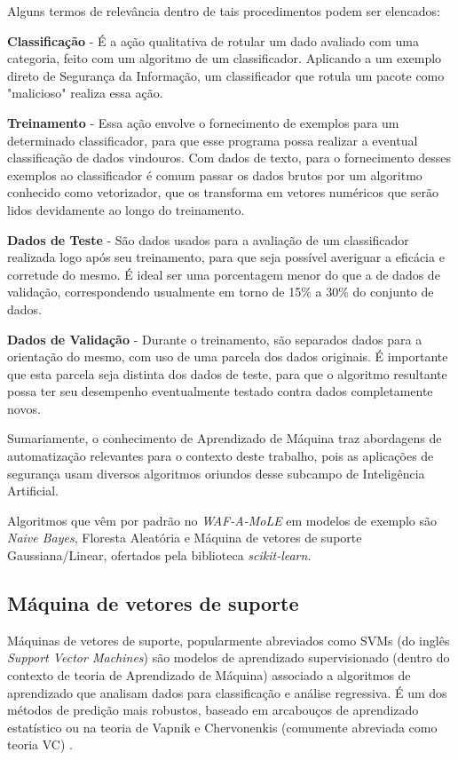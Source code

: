 Alguns termos de relevância dentro de tais procedimentos podem ser elencados:
\begin{alineas}
\item \textbf{Classificação} - É a ação qualitativa de rotular um dado avaliado com uma categoria, feito com um algoritmo de um classificador. Aplicando a um exemplo direto de Segurança da Informação, um classificador que rotula um pacote como "malicioso" realiza essa ação.
\item \textbf{Treinamento} - Essa ação envolve o fornecimento de exemplos para um determinado classificador, para que esse programa possa realizar a eventual classificação de dados vindouros. Com dados de texto, para o fornecimento desses exemplos ao classificador é comum passar os dados brutos por um algoritmo conhecido como vetorizador, que os transforma em vetores numéricos que serão lidos devidamente ao longo do treinamento.
\item \textbf{Dados de Teste} - São dados usados para a avaliação de um classificador realizada logo após seu treinamento, para que seja possível averiguar a eficácia e corretude do mesmo. É ideal ser uma porcentagem menor do que a de dados de validação, correspondendo usualmente em torno de 15\% a 30\% do conjunto de dados.
\item \textbf{Dados de Validação} - Durante o treinamento, são separados dados para a orientação do mesmo, com uso de uma parcela dos dados originais. É importante que esta parcela seja distinta dos dados de teste, para que o algoritmo resultante possa ter seu desempenho eventualmente testado contra dados completamente novos.

\end{alineas}


Sumariamente, o conhecimento de Aprendizado de Máquina traz abordagens
de automatização relevantes para o contexto deste trabalho, pois as aplicações de segurança usam diversos algoritmos oriundos desse subcampo de
Inteligência Artificial.

Algoritmos que vêm por padrão no \textit{WAF-A-MoLE} em modelos de exemplo são \textit{Naive Bayes}, Floresta Aleatória e Máquina de vetores de suporte Gaussiana/Linear, ofertados pela biblioteca \textit{scikit-learn}.

\subsection{Máquina de vetores de suporte}
Máquinas de vetores de suporte, popularmente abreviados como SVMs (do inglês \textit{Support Vector Machines}) são modelos de aprendizado supervisionado (dentro do contexto de teoria de Aprendizado de Máquina) associado a algoritmos de aprendizado que analisam dados para classificação e análise regressiva. É um dos métodos de predição mais robustos, baseado em arcabouços de aprendizado estatístico ou na teoria de Vapnik e Chervonenkis (comumente abreviada como teoria VC) \cite{vapnik_svm_support} \cite{ben2001_vapnik_support}.

